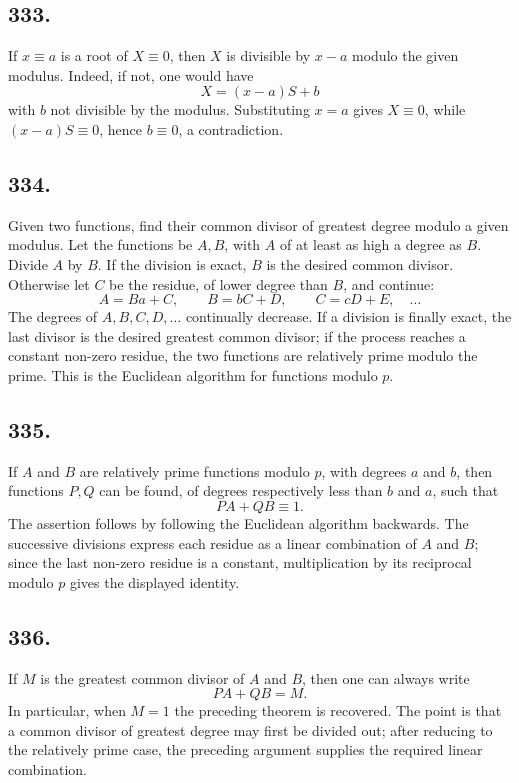 \documentclass[12pt]{article}
\begin{document}
\subsection*{333.}
If $x\equiv a$ is a root of $X\equiv0$, then $X$ is divisible by $x-a$ modulo the given modulus. Indeed, if not, one would have
\[
X=(x-a)S+b
\]
with $b$ not divisible by the modulus. Substituting $x=a$ gives $X\equiv0$, while $(x-a)S\equiv0$, hence $b\equiv0$, a contradiction.

\subsection*{334.}
Given two functions, find their common divisor of greatest degree modulo a given modulus. Let the functions be $A,B$, with $A$ of at least as high a degree as $B$. Divide $A$ by $B$. If the division is exact, $B$ is the desired common divisor. Otherwise let $C$ be the residue, of lower degree than $B$, and continue:
\[
A=Ba+C,\qquad B=bC+D,\qquad C=cD+E,\quad\ldots
\]
The degrees of $A,B,C,D,\ldots$ continually decrease. If a division is finally exact, the last divisor is the desired greatest common divisor; if the process reaches a constant non-zero residue, the two functions are relatively prime modulo the prime. This is the Euclidean algorithm for functions modulo $p$.

\subsection*{335.}
If $A$ and $B$ are relatively prime functions modulo $p$, with degrees $a$ and $b$, then functions $P,Q$ can be found, of degrees respectively less than $b$ and $a$, such that
\[
PA+QB\equiv1.
\]
The assertion follows by following the Euclidean algorithm backwards. The successive divisions express each residue as a linear combination of $A$ and $B$; since the last non-zero residue is a constant, multiplication by its reciprocal modulo $p$ gives the displayed identity.

\subsection*{336.}
If $M$ is the greatest common divisor of $A$ and $B$, then one can always write
\[
PA+QB=M.
\]
In particular, when $M=1$ the preceding theorem is recovered. The point is that a common divisor of greatest degree may first be divided out; after reducing to the relatively prime case, the preceding argument supplies the required linear combination.
\end{document}

